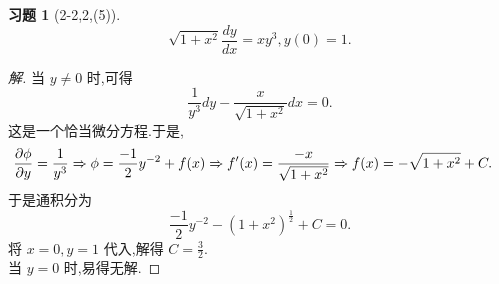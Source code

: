 \documentclass[a4paper, 11pt]{article} %
\newtheorem*{cdtheorem}{习题}
\newenvironment{exercise}
{\begin{mdframed}[backgroundcolor=gray!40,rightline=false,leftline=false,topline=false,bottomline=false]\begin{cdtheorem}}
    {\end{cdtheorem}\end{mdframed}}
\begin{document}
\begin{exercise}[2-2,2,(5)]
$$
\sqrt{1+x^2}\frac{dy}{dx}=xy^3,y(0)=1.
$$  
\end{exercise}
\begin{proof}[解]
当 $y\neq 0$ 时,可得
$$
\frac{1}{y^3}dy-\frac{x}{\sqrt{1+x^2}}dx=0.
$$
这是一个恰当微分方程.于是,
\begin{align*}
\frac{\partial\phi}{\partial y}&=\frac{1}{y^3}\Rightarrow
\phi=\frac{-1}{2}y^{-2}+f(x)\Rightarrow f'(x)=\frac{-x}{\sqrt{1+x^2}}\Rightarrow f(x)=-\sqrt{1+x^{2}}+C.
\end{align*}
于是通积分为
$$
\frac{-1}{2}y^{-2}-(1+x^2)^{\frac{1}{2}}+C=0.
$$
将 $x=0,y=1$ 代入,解得 $C=\frac{3}{2}$.\\

当 $y=0$ 时,易得无解.
\end{proof}
  
  
  
  
\end{document}
